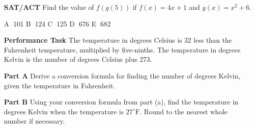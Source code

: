 \documentclass{article}
\newenvironment{practice}[2]{}{}
\newcommand{\placeholder}[2]{}
\begin{document}
\begin{practice}{35}{}
\textbf{SAT/ACT} Find the value of $f(g(5))$ if $f(x) = 4x + 1$ and $g(x) = x^2 + 6$.

\textcircled{A} 101 \quad \textcircled{B} 124 \quad \textcircled{C} 125 \quad \textcircled{D} 676 \quad \textcircled{E} 682
\end{practice}

\begin{practice}{36}{}
\textbf{Performance Task} The temperature in degrees Celsius is 32 less than the Fahrenheit temperature, multiplied by five-ninths. The temperature in degrees Kelvin is the number of degrees Celsius plus 273.

\placeholder{diagram}{Three vertical thermometers side-by-side labeled Celsius, $^\circ$C, Fahrenheit, $^\circ$F, and Kelvin, K. A red dashed line horizontally connects $0^\circ$C, $32^\circ$F, and $273$ K. The Celsius scale has markings from $-40$ to $60$. The Fahrenheit scale has markings from $-50$ to $150$. The Kelvin scale has markings from $230$ to $330$.}

\textbf{Part A} Derive a conversion formula for finding the number of degrees Kelvin, given the temperature in Fahrenheit.

\textbf{Part B} Using your conversion formula from part (a), find the temperature in degrees Kelvin when the temperature is $27^\circ\text{F}$. Round to the nearest whole number if necessary.
\end{practice}
\end{document}

